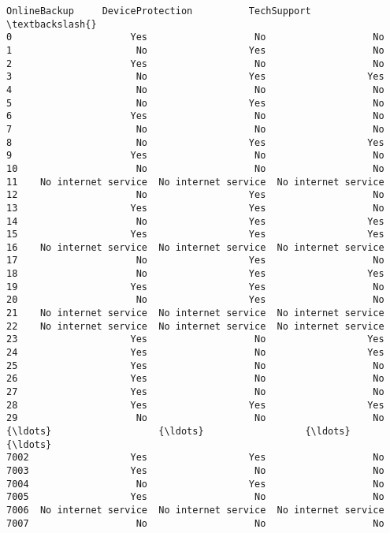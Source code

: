 \documentclass[11pt]{article}
\begin{document}
\begin{tcolorbox}[breakable, boxrule=.5pt, size=fbox, pad at break*=1mm, opacityfill=0]
\begin{Verbatim}[commandchars=\\\{\}]
             OnlineBackup     DeviceProtection          TechSupport  \textbackslash{}
0                     Yes                   No                   No
1                      No                  Yes                   No
2                     Yes                   No                   No
3                      No                  Yes                  Yes
4                      No                   No                   No
5                      No                  Yes                   No
6                     Yes                   No                   No
7                      No                   No                   No
8                      No                  Yes                  Yes
9                     Yes                   No                   No
10                     No                   No                   No
11    No internet service  No internet service  No internet service
12                     No                  Yes                   No
13                    Yes                  Yes                   No
14                     No                  Yes                  Yes
15                    Yes                  Yes                  Yes
16    No internet service  No internet service  No internet service
17                     No                  Yes                   No
18                     No                  Yes                  Yes
19                    Yes                  Yes                   No
20                     No                  Yes                   No
21    No internet service  No internet service  No internet service
22    No internet service  No internet service  No internet service
23                    Yes                   No                  Yes
24                    Yes                   No                  Yes
25                    Yes                   No                   No
26                    Yes                   No                   No
27                    Yes                   No                   No
28                    Yes                  Yes                  Yes
29                     No                   No                   No
{\ldots}                   {\ldots}                  {\ldots}                  {\ldots}
7002                  Yes                  Yes                   No
7003                  Yes                   No                   No
7004                   No                  Yes                   No
7005                  Yes                   No                   No
7006  No internet service  No internet service  No internet service
7007                   No                   No                   No

\end{Verbatim}
\end{tcolorbox}
\end{document}

